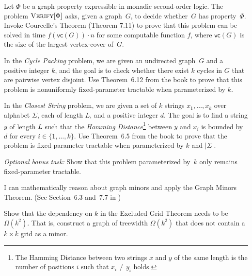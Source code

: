 \documentclass{uebung_cs}
\begin{document}
\begin{exercise}
  Let $\Phi$ be a graph property expressible in monadic second-order logic. The problem $\textsc{Verify}[\Phi]$ asks, given a graph~$G$, to decide whether~$G$ has property~$\Phi$.
  Invoke Courcelle's Theorem (Theorem 7.11) to prove that this problem can be solved in time $f(\mathsf{vc}(G))\cdot n$ for some computable function $f$, where $\mathsf{vc}(G)$ is the size of the largest vertex-cover of~$G$.
\end{exercise}

\begin{exercise}
  In the \emph{Cycle Packing} problem, we are given an undirected graph~$G$ and a positive integer $k$, and the goal is to check whether there exist $k$ cycles in $G$ that are pairwise vertex disjoint. Use Theorem~6.12 from the book to prove that this problem is nonuniformly fixed-parameter tractable when parameterized by $k$.
\end{exercise}

\begin{exercise}
  In the \emph{Closest String} problem, we are given a set of $k$ strings $x_1,\dots,x_k$ over alphabet $\Sigma$, each of length $L$, and a positive integer $d$. The goal is to find a string $y$ of length $L$ such that the \emph{Hamming Distance}\footnote{The Hamming Distance between two strings $x$ and $y$ of the same length is the number of positions $i$ such that $x_i \neq y_i$ holds.} between $y$ and $x_i$ is bounded by $d$ for every $i\in \{1,\dots,k\}$. Use Theorem~6.5 from the book to prove that the problem is fixed-parameter tractable when parameterized by $k$ and $|\Sigma|$.

  \noindent\emph{Optional bonus task:} Show that this problem parameterized by~$k$ only remains fixed-parameter tractable.
\end{exercise}

\newpage
\begin{skill}
  I can mathematically reason about graph minors and apply the Graph Minors Theorem. \normalfont (See Section~6.3 and~7.7 in \cygan{})
\end{skill}

\begin{exercise}
  Show that the dependency on $k$ in the Excluded Grid Theorem needs to be $\Omega(k^2)$. That is, construct a graph of treewidth $\Omega(k^2)$ that does not contain a $k \times k$ grid as a minor.
\end{exercise}
\end{document}
